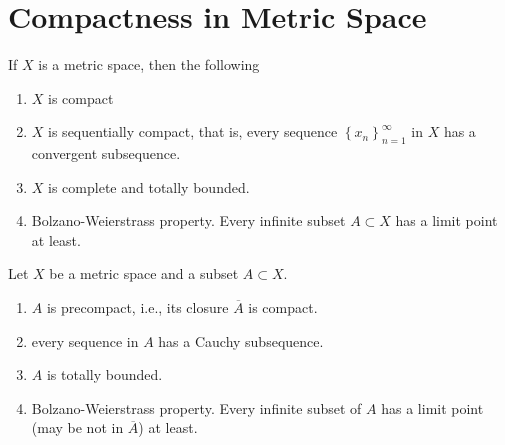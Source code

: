 \documentclass[12pt, a4paper, oneside]{book}
\begin{document}
\section{Compactness in Metric Space}

\begin{theorem}
    If $X$ is a metric space, then the following
    \begin{enumerate}
        \item
              $X$ is compact

        \item  $X$ is sequentially compact, that is, every sequence $\left\{x_n\right\}_{n=1}^\infty$ in $X$ has a convergent subsequence.

        \item  $X$ is complete and totally bounded.

        \item
              Bolzano-Weierstrass property. Every infinite subset $A\subset X$ has a limit point at least.
    \end{enumerate}
\end{theorem}

\begin{corollary}
    Let $X$ be a metric space and a subset $A\subset X$.
    \begin{enumerate}
        \item
              $A$ is precompact, i.e., its closure $\overline{A}$ is compact.
        \item
              every sequence in $A$ has a Cauchy subsequence.
        \item
              $A$ is totally bounded.

        \item
              Bolzano-Weierstrass property. Every infinite subset of $A$ has a limit point (may be not in $\overline{A}$) at least.
    \end{enumerate}
\end{corollary}
\end{document}
